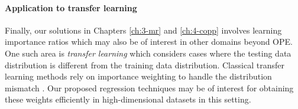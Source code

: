 \paragraph*{Application to transfer learning}
Finally, our solutions in Chapters \ref*{ch:3-mr} and \ref*{ch:4-copp} involves learning importance ratios which may also be of interest in other domains beyond OPE. 
One such area is \emph{transfer learning} which considers cases where the testing data distribution is different from the training data distribution. 
Classical transfer learning methods rely on importance weighting to handle the distribution mismatch \citep{SHIMODAIRA2000Improving, sugiyama2007covariate, huang2007correcting, sugiyama2008direct,lu2021rethinking}. 
Our proposed regression techniques may be of interest for obtaining these weights efficiently in high-dimensional datasets in this setting.  

